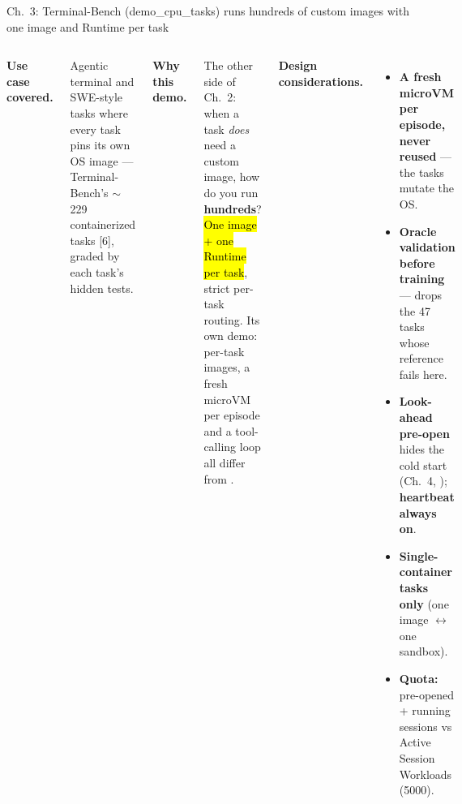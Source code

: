 \begin{frame}{Ch.\ 3: Terminal-Bench (demo\_cpu\_tasks) runs hundreds of custom images with one image and Runtime per task}
\begin{columns}[T]
{\footnotesize\textbf{\color{awsteal}Use case covered.}\par}
{\scriptsize Agentic terminal and SWE-style tasks where every task pins its own OS image --- Terminal-Bench's $\sim$229 containerized tasks [6], graded by each task's hidden tests.\par}
\vspace{2mm}
{\footnotesize\textbf{\color{awsteal}Why this demo.}\par}
{\scriptsize The other side of Ch.\ 2: when a task \emph{does} need a custom image, how do you run \textbf{hundreds}? \hl{One image + one Runtime per task}, strict per-task routing. Its own demo: per-task images, a fresh microVM per episode and a tool-calling loop all differ from .\par}
{\footnotesize\textbf{\color{awsteal}Design considerations.}\par}
\begin{itemize}\scriptsize\setlength{\itemsep}{1.2mm}
\item \textbf{A fresh microVM per episode, never reused} --- the tasks mutate the OS.
\item \textbf{Oracle validation before training} --- drops the 47 tasks whose reference fails here.
\item \textbf{Look-ahead pre-open} hides the cold start (Ch.\ 4, ); \textbf{heartbeat always on}.
\item \textbf{Single-container tasks only} (one image $\leftrightarrow$ one sandbox).
\item \textbf{Quota:} pre-opened + running sessions vs Active Session Workloads (5000).
\end{itemize}
\end{columns}
\end{frame}

